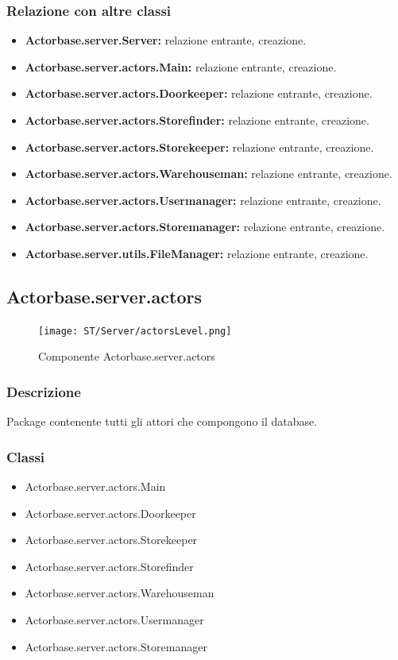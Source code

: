 \documentclass[a4paper]{article}
\begin{document}
			\subsubsection{Relazione con altre classi}
				\begin{itemize}
					\item \textbf{Actorbase.server.Server:} relazione entrante, creazione.
					\item \textbf{Actorbase.server.actors.Main:} relazione entrante, creazione.
					\item \textbf{Actorbase.server.actors.Doorkeeper:} relazione entrante, creazione.
					\item \textbf{Actorbase.server.actors.Storefinder:} relazione entrante, creazione.
					\item \textbf{Actorbase.server.actors.Storekeeper:} relazione entrante, creazione.
					\item \textbf{Actorbase.server.actors.Warehouseman:} relazione entrante, creazione.
					\item \textbf{Actorbase.server.actors.Usermanager:} relazione entrante, creazione.
					\item \textbf{Actorbase.server.actors.Storemanager:} relazione entrante, creazione.
					\item \textbf{Actorbase.server.utils.FileManager:} relazione entrante, creazione.
				\end{itemize}
				
		\subsection{Actorbase.server.actors}
		
			\begin{figure} [H]
				\centering
				\texttt{[image: ST/Server/actorsLevel.png]}
				\caption{Componente Actorbase.server.actors}
			\end{figure}
			
			\subsubsection{Descrizione}
				Package contenente tutti gli attori che compongono il database.
				
			\subsubsection{Classi}
				\begin{itemize}
					\item Actorbase.server.actors.Main
					\item Actorbase.server.actors.Doorkeeper
					\item Actorbase.server.actors.Storekeeper
					\item Actorbase.server.actors.Storefinder
					\item Actorbase.server.actors.Warehouseman
					\item Actorbase.server.actors.Usermanager
					\item Actorbase.server.actors.Storemanager
				\end{itemize}
		
\end{document}
